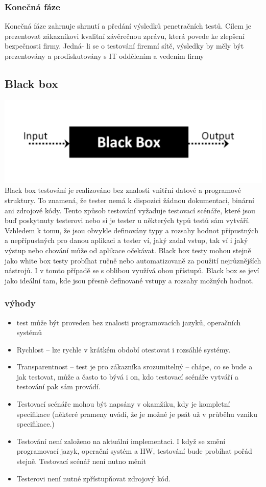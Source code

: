 \documentclass{article}
\begin{document}
\subsubsection{Konečná fáze}Konečná fáze zahrnuje shrnutí a předání výsledků penetračních testů. Cílem je prezentovat
zákazníkovi kvalitní závěrečnou zprávu, která povede ke zlepšení bezpečnosti firmy. Jedná-
li se o testování firemní sítě, výsledky by měly být prezentovány a prodiskutovány s IT
oddělením a vedením firmy
\subsection{Black box}
\includegraphics{bb}
Black box testování je realizováno bez znalosti vnitřní datové a programové struktury.
To znamená, že tester nemá k dispozici žádnou dokumentaci, binární ani zdrojové kódy. Tento způsob testování vyžaduje testovací scénáře, které jsou buď poskytnuty testerovi nebo si je tester u některých typů testů sám vytváří. Vzhledem k tomu, že jsou obvykle definovány typy a rozsahy hodnot přípustných a nepřípustných pro danou aplikaci a tester ví, jaký zadal vstup, tak ví i jaký výstup nebo chování může od aplikace očekávat. Black box testy mohou stejně jako white box testy probíhat ručně nebo automatizovaně za použití nejrůznějších nástrojů. I v tomto případě se s oblibou využívá obou přístupů. Black box se jeví jako ideální tam, kde jsou přesně definované vstupy a rozsahy možných hodnot.
\subsubsection{výhody}
\begin{itemize}
    \item test může být proveden bez znalosti programovacích jazyků, operačních systémů
    \item Rychlost – lze rychle v krátkém období otestovat i rozsáhlé systémy.
    \item Transparentnost – test je pro zákazníka srozumitelný – chápe, co se bude a jak testovat, může a často to bývá i on, kdo testovací scénáře vytváří a testování pak sám provádí.
    \item Testovací scénáře mohou být napsány v okamžiku, kdy je kompletní specifikace (některé prameny uvádí, že je možné je psát už v průběhu vzniku specifikace.)
    \item Testování není založeno na aktuální implementaci. I když se změní programovací jazyk, operační systém a HW, testování bude probíhat pořád stejně. Testovací scénář není nutno měnit
    \item Testerovi není nutné zpřístupňovat zdrojový kód.
\end{itemize}
\end{document}
